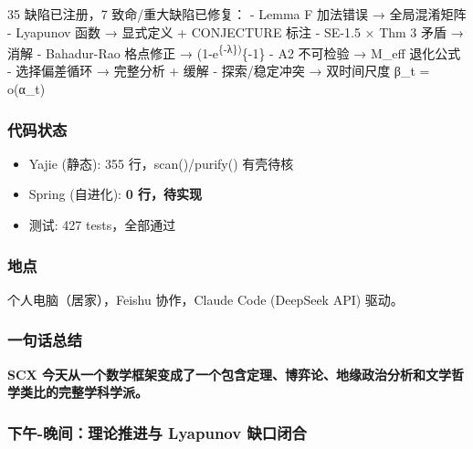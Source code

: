 \documentclass[
  12pt,
]{ctexart}
\providecommand{\tightlist}{%
  \setlength{\itemsep}{0pt}\setlength{\parskip}{0pt}}
\begin{document}
35 缺陷已注册，7 致命/重大缺陷已修复： - Lemma F 加法错误 → 全局混淆矩阵
- Lyapunov 函数 → 显式定义 + CONJECTURE 标注 - SE-1.5 × Thm 3 矛盾 →
消解 - Bahadur-Rao 格点修正 → (1-e\textsuperscript{\{-λ\})}\{-1\} - A2
不可检验 → M\_eff 退化公式 - 选择偏差循环 → 完整分析 + 缓解 -
探索/稳定冲突 → 双时间尺度 β\_t = o(α\_t)

\subsubsection{代码状态}\label{ux4ee3ux7801ux72b6ux6001}

\begin{itemize}
\tightlist
\item
  Yajie (静态): 355 行，scan()/purify() 有壳待核
\item
  Spring (自进化): \textbf{0 行，待实现}
\item
  测试: 427 tests，全部通过
\end{itemize}

\subsubsection{地点}\label{ux5730ux70b9}

个人电脑（居家），Feishu 协作，Claude Code (DeepSeek API) 驱动。

\subsubsection{一句话总结}\label{ux4e00ux53e5ux8bddux603bux7ed3}

\textbf{SCX
今天从一个数学框架变成了一个包含定理、博弈论、地缘政治分析和文学哲学类比的完整学科学派。}

\subsubsection{下午-晚间：理论推进与 Lyapunov
缺口闭合}\label{ux4e0bux5348-ux665aux95f4ux7406ux8bbaux63a8ux8fdbux4e0e-lyapunov-ux7f3aux53e3ux95edux5408}
\end{document}
